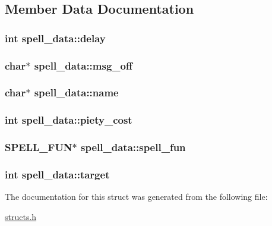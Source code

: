 \subsection{Member Data Documentation}
\hypertarget{structspell__data_a7223664497a8ecd687bc91b6d5d1f226}{
\subsubsection[{delay}]{\setlength{\rightskip}{0pt plus 5cm}int spell\-\_\-data\-::delay}}\label{structspell__data_a7223664497a8ecd687bc91b6d5d1f226}
\hypertarget{structspell__data_a0f91bd1c3c4a450403d23be5c00a0b71}{
\subsubsection[{msg\-\_\-off}]{\setlength{\rightskip}{0pt plus 5cm}char$\ast$ spell\-\_\-data\-::msg\-\_\-off}}\label{structspell__data_a0f91bd1c3c4a450403d23be5c00a0b71}
\hypertarget{structspell__data_a89508e1eae34147448b293496e95ccfc}{
\subsubsection[{name}]{\setlength{\rightskip}{0pt plus 5cm}char$\ast$ spell\-\_\-data\-::name}}\label{structspell__data_a89508e1eae34147448b293496e95ccfc}
\hypertarget{structspell__data_a97c8e1276ff4e5b1b07f2766c619c7dd}{
\subsubsection[{piety\-\_\-cost}]{\setlength{\rightskip}{0pt plus 5cm}int spell\-\_\-data\-::piety\-\_\-cost}}\label{structspell__data_a97c8e1276ff4e5b1b07f2766c619c7dd}
\hypertarget{structspell__data_a330ef35c27c31ce4676ff7cb93cdaa64}{
\subsubsection[{spell\-\_\-fun}]{\setlength{\rightskip}{0pt plus 5cm}S\-P\-E\-L\-L\-\_\-\-F\-U\-N$\ast$ spell\-\_\-data\-::spell\-\_\-fun}}\label{structspell__data_a330ef35c27c31ce4676ff7cb93cdaa64}
\hypertarget{structspell__data_ac2e0d321db318e6290cb85aef4074918}{
\subsubsection[{target}]{\setlength{\rightskip}{0pt plus 5cm}int spell\-\_\-data\-::target}}\label{structspell__data_ac2e0d321db318e6290cb85aef4074918}


The documentation for this struct was generated from the following file\-:\begin{DoxyCompactItemize}
\item 
\hyperlink{structs_8h}{structs.\-h}\end{DoxyCompactItemize}
